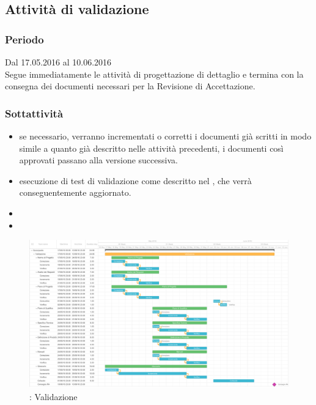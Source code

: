 \documentclass[a4paper, titlepage]{article}
\begin{document}
	\subsection{Attività di validazione}
	\subsubsection{Periodo}
	Dal 17.05.2016 al 10.06.2016\\
	Segue immediatamente le attività di progettazione di dettaglio  e termina con la consegna dei documenti necessari per la Revisione di Accettazione.
	
	\subsubsection{Sottattività}
	\begin{itemize}
		\item {} se necessario, verranno incrementati o corretti i documenti già scritti in modo simile a quanto già descritto nelle attività precedenti, i documenti così approvati passano alla versione successiva.
		\item {} esecuzione di test di validazione come descritto nel , che verrà conseguentemente aggiornato.
		\item {} 
		\item {} 
	\end{itemize}
	
	\newpage
	\begin{figure}[!ht]
		\includegraphics[scale=0.3]{Img/Grafici_Gantt/Validazione.pdf}
		\caption{ : Validazione}
	\end{figure}
	
\end{document}
